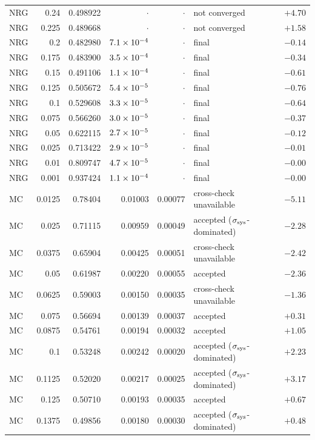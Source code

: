 {\begin{longtable}{@{}l r r r r l r@{}}
NRG & 0.24 & 0.498922 & $\cdot$ & $\cdot$ & not converged & $+4.70$\\
NRG & 0.225 & 0.489668 & $\cdot$ & $\cdot$ & not converged & $+1.58$\\
NRG & 0.2 & 0.482980 & $7.1\times10^{-4}$ & $\cdot$ & final & $-0.14$\\
NRG & 0.175 & 0.483900 & $3.5\times10^{-4}$ & $\cdot$ & final & $-0.34$\\
NRG & 0.15 & 0.491106 & $1.1\times10^{-4}$ & $\cdot$ & final & $-0.61$\\
NRG & 0.125 & 0.505672 & $5.4\times10^{-5}$ & $\cdot$ & final & $-0.76$\\
NRG & 0.1 & 0.529608 & $3.3\times10^{-5}$ & $\cdot$ & final & $-0.64$\\
NRG & 0.075 & 0.566260 & $3.0\times10^{-5}$ & $\cdot$ & final & $-0.37$\\
NRG & 0.05 & 0.622115 & $2.7\times10^{-5}$ & $\cdot$ & final & $-0.12$\\
NRG & 0.025 & 0.713422 & $2.9\times10^{-5}$ & $\cdot$ & final & $-0.01$\\
NRG & 0.01 & 0.809747 & $4.7\times10^{-5}$ & $\cdot$ & final & $-0.00$\\
NRG & 0.001 & 0.937424 & $1.1\times10^{-4}$ & $\cdot$ & final & $-0.00$\\
MC & 0.0125 & 0.78404 & 0.01003 & 0.00077 & cross-check unavailable & $-5.11$\\
MC & 0.025 & 0.71115 & 0.00959 & 0.00049 & accepted ($\sigma_{\rm sys}$-dominated) & $-2.28$\\
MC & 0.0375 & 0.65904 & 0.00425 & 0.00051 & cross-check unavailable & $-2.42$\\
MC & 0.05 & 0.61987 & 0.00220 & 0.00055 & accepted & $-2.36$\\
MC & 0.0625 & 0.59003 & 0.00150 & 0.00035 & cross-check unavailable & $-1.36$\\
MC & 0.075 & 0.56694 & 0.00139 & 0.00037 & accepted & $+0.31$\\
MC & 0.0875 & 0.54761 & 0.00194 & 0.00032 & accepted & $+1.05$\\
MC & 0.1 & 0.53248 & 0.00242 & 0.00020 & accepted ($\sigma_{\rm sys}$-dominated) & $+2.23$\\
MC & 0.1125 & 0.52020 & 0.00217 & 0.00025 & accepted ($\sigma_{\rm sys}$-dominated) & $+3.17$\\
MC & 0.125 & 0.50710 & 0.00193 & 0.00035 & accepted & $+0.67$\\
MC & 0.1375 & 0.49856 & 0.00180 & 0.00030 & accepted ($\sigma_{\rm sys}$-dominated) & $+0.48$\\

\end{longtable}}
